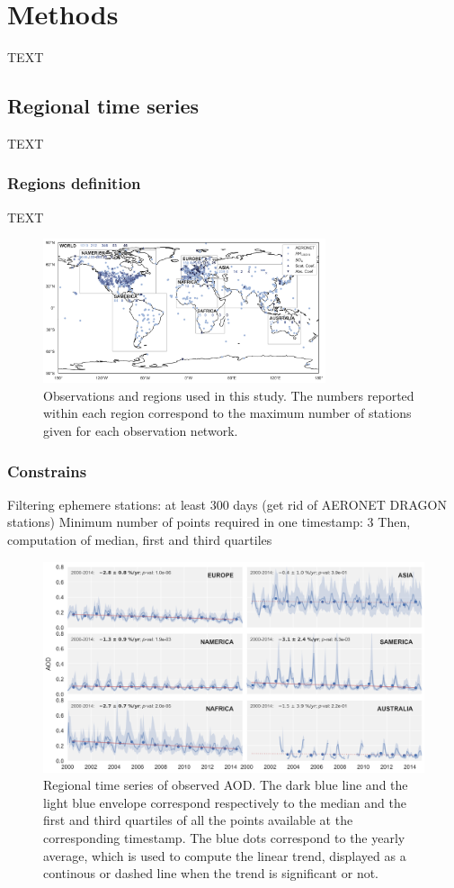 \documentclass[journal abbreviation, manuscript]{copernicus}
\begin{document}
\section{Methods}
TEXT


\subsection{Regional time series}
TEXT

\subsubsection{Regions definition}
TEXT
\begin{figure}
 \includegraphics[width=8.3cm]{../scripts/figs/maps/av_obs.png}
 \caption{Observations and regions used in this study. The numbers reported within each region correspond to the maximum number of stations given for each observation network.}
 \label{map_obs}
\end{figure}

\subsubsection{Constrains}
Filtering ephemere stations: at least 300 days (get rid of AERONET DRAGON stations)
Minimum number of points required in one timestamp: 3
Then, computation of median, first and third quartiles
\begin{figure}
 \includegraphics[width=12cm]{../scripts/figs/ts/panel-od550aer.png}
 \caption{Regional time series of observed AOD. The dark blue line and the light blue envelope correspond respectively to the median and the first and third quartiles of all the points available at the corresponding timestamp. The blue dots correspond to the yearly average, which is used to compute the linear trend, displayed as a continous or dashed line when the trend is significant or not.}
 \label{ts_aod}
\end{figure}
\end{document}
